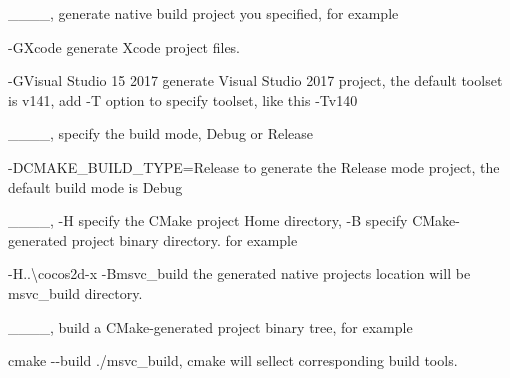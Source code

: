 \begin{DoxyEnumerate}
\item \+\_\+\+\_\+\_\+\+\_\+, generate native build project you specified, for example
\begin{DoxyItemize}
\item {\ttfamily -\/\+G\+Xcode} generate Xcode project files.
\item {\ttfamily -\/\+G\+Visual Studio 15 2017} generate Visual Studio 2017 project, the default toolset is v141, add {\ttfamily -\/T} option to specify toolset, like this {\ttfamily -\/\+Tv140}
\end{DoxyItemize}
\end{DoxyEnumerate}
\begin{DoxyEnumerate}
\item \+\_\+\+\_\+\_\+\+\_\+, specify the build mode, Debug or Release
\begin{DoxyItemize}
\item {\ttfamily -\/\+D\+C\+M\+A\+K\+E\+\_\+\+B\+U\+I\+L\+D\+\_\+\+T\+Y\+PE=Release} to generate the Release mode project, the default build mode is Debug
\end{DoxyItemize}
\end{DoxyEnumerate}
\begin{DoxyEnumerate}
\item \+\_\+\+\_\+\_\+\+\_\+, {\ttfamily -\/H} specify the C\+Make project Home directory, {\ttfamily -\/B} specify C\+Make-\/generated project binary directory. for example
\begin{DoxyItemize}
\item {\ttfamily -\/H..\textbackslash{}cocos2d-\/x -\/\+Bmsvc\+\_\+build} the generated native project\textquotesingle{}s location will be {\ttfamily msvc\+\_\+build} directory.
\end{DoxyItemize}
\end{DoxyEnumerate}
\begin{DoxyEnumerate}
\item \+\_\+\+\_\+\_\+\+\_\+, build a C\+Make-\/generated project binary tree, for example
\begin{DoxyItemize}
\item {\ttfamily cmake -\/-\/build ./msvc\+\_\+build}, cmake will sellect corresponding build tools.
\end{DoxyItemize}
\end{DoxyEnumerate}

